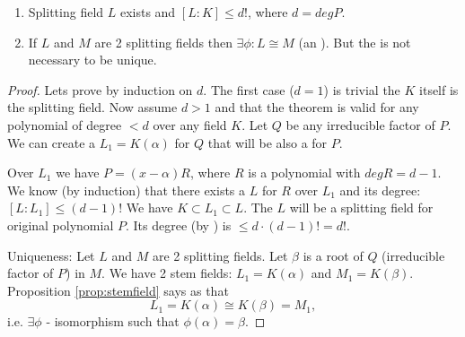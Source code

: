\begin{theorem}
  \begin{enumerate}
    \item Splitting field $L$ exists and $\left[L:K\right] \le d!$,
      where $d = deg P$.
    \item If $L$ and $M$ are 2 splitting fields then
      $\exists \phi: L \cong M$ (an ). But
      the  is not necessary to be unique.
  \end{enumerate}
  \begin{proof}
    Lets prove by induction on $d$. The first case ($d = 1$) is
    trivial the $K$ itself is the splitting field. Now assume $d > 1$
    and that the theorem is valid for any polynomial of degree $< d$
    over any field $K$. Let $Q$ be any irreducible factor of $P$. We
    can create a  $L_1 = K\left(\alpha\right)$
    for $Q$ that will be also a  for $P$.

    Over $L_1$ we have $P = (x - \alpha) R$, where $R$ is a polynomial
    with $deg R = d - 1$. We know (by induction) that
    there exists a  $L$ for $R$ over $L_1$
    and its degree:
    \(
    \left[L:L_1\right] \le (d-1)!
    \)
    We have $K \subset L_1 \subset L$. The $L$ will be a splitting
    field for original polynomial $P$. Its degree (by
    ) is $ \le d \cdot (d-1)! = d!$.

    Uniqueness: Let $L$ and $M$ are 2 splitting fields. Let $\beta$ is
    a root of $Q$ (irreducible factor of $P$) in $M$.
    We have 2 stem fields: $L_1 = K\left(\alpha\right)$ and
    $M_1 = K\left(\beta\right)$. Proposition \ref{prop:stemfield} says
    as that
    \[
    L_1 = K\left(\alpha\right) \cong
    K\left(\beta\right) = M_1, 
    \]
    i.e. $\exists \phi$ - isomorphism such that $\phi(\alpha) = \beta$. 


\end{proof}
\end{theorem}
